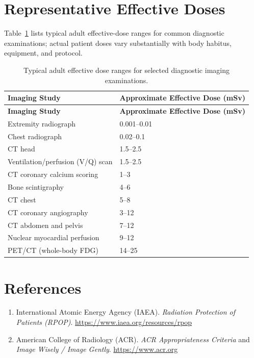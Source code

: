 \section{Representative Effective Doses}
Table~\ref{tab:radiation_doses} lists typical adult effective-dose ranges for common diagnostic examinations; actual patient doses vary substantially with body habitus, equipment, and protocol.

\begin{longtable}{@{}ll@{}}
\caption{Typical adult effective dose ranges for selected diagnostic imaging examinations.}
\label{tab:radiation_doses} \\
\toprule
\textbf{Imaging Study} & \textbf{Approximate Effective Dose (mSv)} \\
\midrule
\endfirsthead
\toprule
\textbf{Imaging Study} & \textbf{Approximate Effective Dose (mSv)} \\
\midrule
\endhead
Extremity radiograph & 0.001--0.01 \\
Chest radiograph & 0.02--0.1 \\
CT head & 1.5--2.5 \\
Ventilation/perfusion (V/Q) scan & 1.5--2.5 \\
CT coronary calcium scoring & 1--3 \\
Bone scintigraphy & 4--6 \\
CT chest & 5--8 \\
CT coronary angiography & 3--12 \\
CT abdomen and pelvis & 7--12 \\
Nuclear myocardial perfusion & 9--12 \\
PET/CT (whole-body FDG) & 14--25 \\
\bottomrule
\end{longtable}

\section*{References}
\begin{enumerate}
  \item International Atomic Energy Agency (IAEA). \textit{Radiation Protection of Patients (RPOP)}. \url{https://www.iaea.org/resources/rpop}
  \item American College of Radiology (ACR). \textit{ACR Appropriateness Criteria} and \textit{Image Wisely / Image Gently}. \url{https://www.acr.org}
\end{enumerate}

